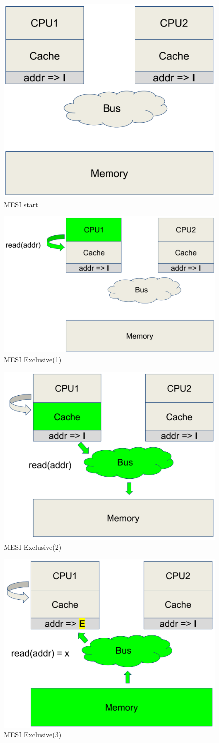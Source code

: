 \documentclass[10pt,a4paper,oneside,titlepage]{article}
\theoremstyle{plain}
\theoremstyle{defenition}
\begin{document}
\begin{figure}[h!]
	\centering
	\includegraphics[width=0.4\linewidth]{pictures/MESI1}
	\caption{MESI start}
	\label{fig:mesi1}
\end{figure}

\begin{figure}[h!]
	\centering
	\includegraphics[width=0.4\linewidth]{pictures/MESI2}
	\caption{MESI Exclusive(1)}
	\label{fig:mesi2}
\end{figure}

\begin{figure}[h!]
	\centering
	\includegraphics[width=0.4\linewidth]{pictures/MESI3}
	\caption{MESI Exclusive(2)}
	\label{fig:mesi3}
\end{figure}

\begin{figure}[h!]
	\centering
	\includegraphics[width=0.4\linewidth]{pictures/MESI4}
	\caption{MESI Exclusive(3)}
	\label{fig:mesi4}
\end{figure}
\end{document}
